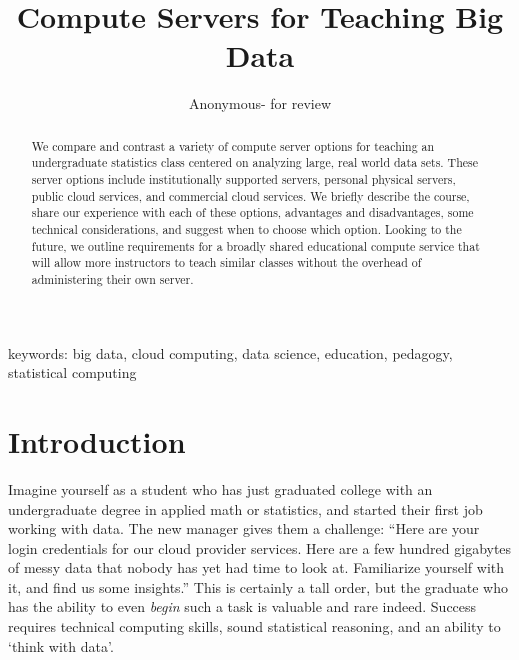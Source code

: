 \documentclass[12pt]{article}
\title{Compute Servers for Teaching Big Data}
\author{Anonymous- for review}
\begin{document}


\maketitle

keywords: big data, cloud computing, data science, education, pedagogy, statistical computing

\newpage

\begin{abstract}

    We compare and contrast a variety of compute server options for teaching an undergraduate statistics class centered on analyzing large, real world data sets.
These server options include institutionally supported servers, personal physical servers, public cloud services, and commercial cloud services.
We briefly describe the course, share our experience with each of these options, advantages and disadvantages, some technical considerations, and suggest when to choose which option.
Looking to the future, we outline requirements for a broadly shared educational compute service that will allow more instructors to teach similar classes without the overhead of administering their own server.

\end{abstract}


\section{Introduction}

Imagine yourself as a student who has just graduated college with an undergraduate degree in applied math or statistics, and started their first job working with data.
The new manager gives them a challenge: ``Here are your login credentials for our cloud provider services. Here are a few hundred gigabytes of messy data that nobody has yet had time to look at. Familiarize yourself with it, and find us some insights.''
This is certainly a tall order, but the graduate who has the ability to even \emph{begin} such a task is valuable and rare indeed.
Success requires technical computing skills, sound statistical reasoning, and an ability to `think with data'.
\end{document}
